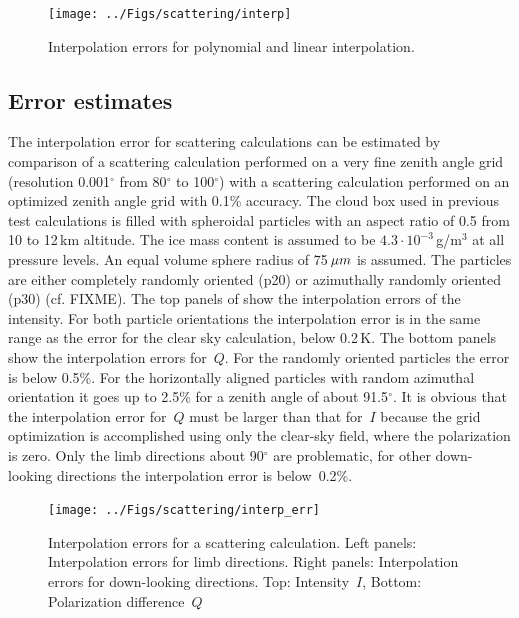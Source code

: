 \begin{figure}[htbp]
\centering
  \texttt{[image: ../Figs/scattering/interp]}
  \caption{Interpolation errors for polynomial and linear interpolation.
  }
  \label{fig:scattering:interp}  
\end{figure}

\subsection{Error estimates}
The interpolation error for scattering calculations can be estimated
by comparison of a scattering calculation performed on a very fine
zenith angle grid (resolution 0.001$^\circ$ from 80$^\circ$ to
100$^\circ$) with a scattering calculation performed on an optimized
zenith angle grid with 0.1\% accuracy. The cloud box used in previous
test calculations is filled with spheroidal particles with an aspect
ratio of 0.5 from 10 to 12\,km altitude. The ice mass content is
assumed to be $4.3\cdot10^{-3}$\,g/m$^3$ at all pressure levels.  
An equal volume sphere radius of 75$\,\mu m$ is assumed. The particles are
either completely randomly oriented (p20) or azimuthally randomly
oriented (p30) (cf. FIXME).%
The top panels of
 show the interpolation errors of the
intensity.  For both particle orientations the interpolation error is
in the same range as the error for the clear sky calculation, below
0.2\,K. The bottom panels show the interpolation errors for~$Q$. For the
randomly oriented particles the error is below 0.5\%. For the
horizontally aligned particles with random azimuthal orientation it goes up to 2.5\% for a
zenith angle of about 91.5$^\circ$. It is obvious that the
interpolation error for~$Q$ must be larger than that for~$I$ because the
grid optimization is accomplished using only the clear-sky field,
where the polarization is zero. Only the limb directions about
90$^\circ$ are problematic, for other down-looking directions the
interpolation error is below~0.2\%.

\begin{figure}[htbp]
  \centering
  \texttt{[image: ../Figs/scattering/interp\_err]}
  \caption{Interpolation errors for a scattering calculation.
    Left panels: Interpolation errors for limb directions.
    Right panels: Interpolation errors for down-looking directions.
    Top: Intensity~$I$, Bottom: Polarization difference~$Q$}
  \label{fig:scattering:interp_err}  
\end{figure}

